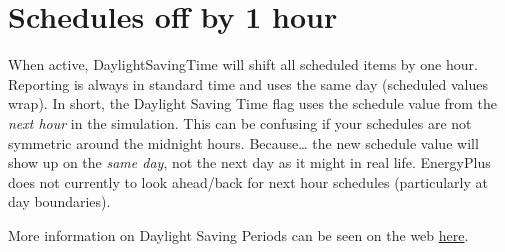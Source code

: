 \section{Schedules off by 1 hour}\label{schedules-off-by-1-hour}

When active, DaylightSavingTime will shift all scheduled items by one hour. Reporting is always in standard time and uses the same day (scheduled values wrap). In short, the Daylight Saving Time flag uses the schedule value from the \emph{next hour} in the simulation. This can be confusing if your schedules are not symmetric around the midnight hours. Because\ldots{} the new schedule value will show up on the \emph{same day}, not the next day as it might in real life. EnergyPlus does not currently to look ahead/back for next hour schedules (particularly at day boundaries).

More information on Daylight Saving Periods can be seen on the web \href{http://www.webexhibits.org/daylightsaving/}{here}.
